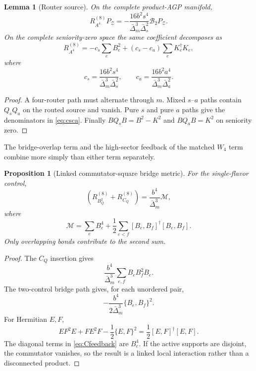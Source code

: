 \documentclass[11pt]{article}
\newtheorem{proposition}[theorem]{Proposition}
\newtheorem{lemma}[theorem]{Lemma}
\theoremstyle{definition}
\theoremstyle{remark}
\newcommand{\cZ}{\mathcal Z}
\newcommand{\cM}{\mathcal M}
\newcommand{\cB}{\mathcal B}
\begin{document}
\begin{lemma}[Router source]
\label{lem:router-source}
On the complete product-AGP manifold,
\begin{equation}
 R_{A^4}^{(8)}P_{\cZ}
 =-\frac{16b^2s^4}{\bar\Delta_m^3\bar\Delta_s^2}
 \cB_2P_{\cZ}.
 \label{eq:A4source}
\end{equation}
On the complete seniority-zero space the same coefficient decomposes as
\begin{equation}
 R_{A^4}^{(8)}
 =-c_s\sum_eB_e^2+(c_s-c_a)\sum_eK_e^\dagger K_e,
 \label{eq:A4decomp}
\end{equation}
where
\begin{equation}
 c_s=\frac{16b^2s^4}{\bar\Delta_m^3\bar\Delta_s^2},
 \qquad
 c_a=\frac{16b^2a^4}{\bar\Delta_m^3\bar\Delta_a^2}.
 \label{eq:csca}
\end{equation}
\end{lemma}

\begin{proof}
A four-router path must alternate through $m$.  Mixed $s$--$a$ paths contain $Q_sQ_a$ on the routed source and vanish.  Pure $s$ and pure $a$ paths give the denominators in \eqref{eq:csca}.  Finally $B Q_sB=B^2-K^2$ and $BQ_aB=K^2$ on seniority zero.
\end{proof}

The bridge-overlap term and the high-sector feedback of the matched $W_4$ term combine more simply than either term separately.

\begin{proposition}[Linked commutator-square bridge metric]
\label{prop:M}
For the single-flavor control,
\begin{equation}
 \left(R_{B_Q^2}^{(8)}+R_{C_Q}^{(8)}\right)
 =\frac{b^4}{\bar\Delta_m^3}\cM,
 \label{eq:BCM}
\end{equation}
where
\begin{equation}
 \boxed{
 \cM=\sum_eB_e^4+\frac12\sum_{e<f}
 [B_e,B_f]^\dagger[B_e,B_f].}
 \label{eq:M}
\end{equation}
Only overlapping bonds contribute to the second sum.
\end{proposition}

\begin{proof}
The $C_Q$ insertion gives
\begin{equation}
 \frac{b^4}{\bar\Delta_m^3}\sum_{e,f}B_eB_f^2B_e.
 \label{eq:Cfeedback}
\end{equation}
The two-control bridge path gives, for each unordered pair,
\begin{equation}
 -\frac{b^4}{2\bar\Delta_m^3}\{B_e,B_f\}^2.
 \label{eq:overlap-pair}
\end{equation}
For Hermitian $E,F$,
\begin{equation}
 EF^2E+FE^2F-\frac12\{E,F\}^2
 =\frac12[E,F]^\dagger[E,F].
 \label{eq:comm-identity}
\end{equation}
The diagonal terms in \eqref{eq:Cfeedback} are $B_e^4$.  If the active supports are disjoint, the commutator vanishes, so the result is a linked local interaction rather than a disconnected product.
\end{proof}
\end{document}
